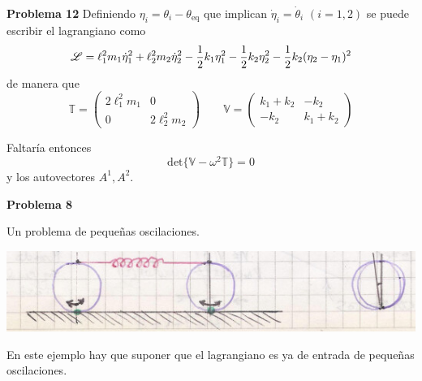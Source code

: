 \documentclass[10pt,oneside]{CBFT_book}
\begin{document}
\begin{ejemplo}{\bf Problema 12}
Definiendo $\eta_i = \theta_i - \theta_{\mbox{eq}}$ que implican $\dot{\eta}_i = \dot{\theta}_i $ $(i=1,2)$ se puede escribir el lagrangiano como 
\[
	\mathscr{L} = \ell_1^2 m_1 \dot{\eta}_1^2 + \ell_2^2 m_2 \dot{\eta}_2^2 - \frac{1}{2} k_1 \eta_1^2 - \frac{1}{2} k_2 \eta_2^2 - \frac{1}{2} k_2 (\eta_2 - \eta_1)^2
\]
de manera que 
\[
	\mathbb{T} = \begin{pmatrix}
	 2 \ell^2_1 m_1 & 0 \\
	 0 & 2 \ell^2_2 m_2 
	\end{pmatrix}
	\qquad 
	\mathbb{V} = \begin{pmatrix}
	 k_1 + k_2 & - k_2 \\
	 -k_2  & k_1 + k_ 2 
	\end{pmatrix}
\]

Faltaría entonces
\[
	\mbox{det} \{ \mathbb{V} - \omega^2 \mathbb{T} \} = 0
\]
y los autovectores $A^1, A^2$.


\end{ejemplo}

\begin{ejemplo}{\bf Problema 8}

Un problema de pequeñas oscilaciones.

\includegraphics[scale=0.5]{images/fig_mc_problema_8.jpg} 

En este ejemplo hay que suponer que el lagrangiano es ya de entrada de pequeñas oscilaciones.

\end{ejemplo}














\end{document}
